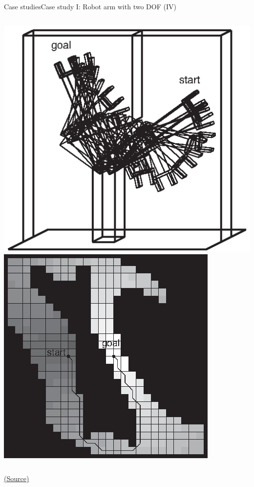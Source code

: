 \documentclass[10pt,compress]{beamer} %
\begin{document}
\begin{frame}{Case studies}{Case study I: Robot arm with two DOF (IV)}
       \begin{columns}
	            \centering \includegraphics[width=\linewidth]{figs/armDPwithoutPotentialWorkspaceCoarse.eps}\\
	            \centering \includegraphics[width=\linewidth]{figs/armDPwithoutPotentialCoarse.eps}\\
      \end{columns}
	  \centering \tiny{\href{http://aima.cs.berkeley.edu/index.html}{(Source)}}
\end{frame}
\end{document}
